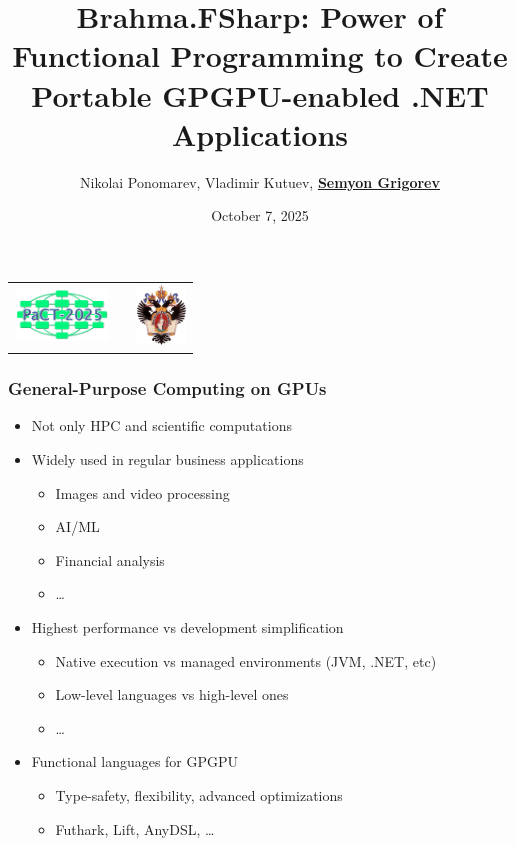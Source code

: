 \documentclass[xcolor=table,aspectratio=169]{beamer}
\title[Brahma.FSharp: GPGPU + .NET]{Brahma.FSharp: Power of Functional Programming to Create Portable GPGPU-enabled .NET Applications}
\institute[SPbSU]{
St. Petersburg State University
}
\author[Semyon Grigorev]{Nikolai Ponomarev, Vladimir Kutuev, \underline{\textbf{Semyon Grigorev}}}
\date{October 7, 2025}
\begin{document}
{
\begin{frame}[fragile]
  \begin{table}
  \centering
  \begin{tabularx}{\linewidth}{XcX}
    \includegraphics[height=1.4cm]{pictures/pact_2025_logo.png} \hfill
    & 
    & \hfill \includegraphics[height=1.6cm]{pictures/SPbGU_Logo.png}
  \end{tabularx}
  \end{table}
  \titlepage
\end{frame}
}


\begin{frame}[fragile]
  \frametitle{General-Purpose Computing on GPUs}
  \begin{itemize}
    \item Not only HPC and scientific computations
    \item Widely used in regular business applications
      \begin{itemize}
        \item Images and video processing
        \item AI/ML
        \item Financial analysis
        \item \ldots
      \end{itemize}
    \item Highest performance vs development simplification
      \begin{itemize}
        \item Native execution vs managed environments (JVM, .NET, etc)
        \item Low-level languages vs high-level ones
        \item \ldots
      \end{itemize}
    \item Functional languages for GPGPU 
      \begin{itemize}
        \item Type-safety, flexibility, advanced optimizations 
        \item Futhark, Lift, AnyDSL, \ldots
      \end{itemize}
    \end{itemize}
\end{frame}
\end{document}
